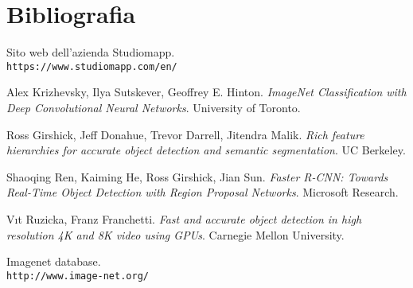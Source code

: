 \section{Bibliografia}

\begin{thebibliography}{99}

Sito web dell'azienda Studiomapp.
\\\texttt{https://www.studiomapp.com/en/}
 
Alex Krizhevsky, Ilya Sutskever, Geoffrey E. Hinton.
\textit{ImageNet Classification with Deep Convolutional
Neural Networks}. University of Toronto. 
 
Ross Girshick, Jeff Donahue, Trevor Darrell, Jitendra Malik.
\textit{Rich feature hierarchies for accurate object detection and semantic segmentation}. UC Berkeley. 
 
Shaoqing Ren, Kaiming He, Ross Girshick, Jian Sun.
\textit{Faster R-CNN: Towards Real-Time Object Detection
with Region Proposal Networks}. Microsoft Research.
 
Vıt Ruzicka, Franz Franchetti.
\textit{Fast and accurate object detection in high resolution 4K and 8K video using GPUs}. Carnegie Mellon University.

Imagenet database.
\\\texttt{http://www.image-net.org/}


\end{thebibliography}